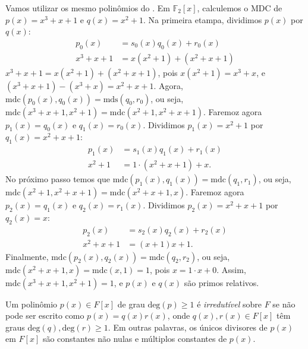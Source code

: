 \begin{example}
  Vamos utilizar os mesmo polinômios do .
  Em $\mathbb{F}_2[x]$, calculemos o MDC de $p(x) = x^3 + x + 1$ e $q(x) = x^2 + 1$. 
  Na primeira etampa, dividimos $p(x)$ por $q(x)$: 
  \begin{subequations}
    \begin{align}
    p_0(x) &= s_0(x) q_0(x) + r_0(x) \\
    x^3 + x + 1 &= x (x^2 + 1) + (x^2 + x + 1) 
    \end{align}
  \end{subequations}
  $x^3 + x + 1 = x (x^2 + 1) + (x^2 + x + 1)$, pois $x (x^2 + 1) = x^3 + x$, e $(x^3 + x + 1) - (x^3 + x) = x^2 + x + 1$. 
  Agora, $\text{mdc}(p_0(x),q_0(x)) = \text{mds}(q_0,r_0)$, ou seja, $\text{mdc}(x^3 + x + 1, x^2 + 1) = \text{mdc}(x^2 + 1, x^2 + x + 1)$.
  Faremoz agora $p_1(x) = q_0(x)$ e $q_1(x) = r_0(x)$.
  Dividimos $p_1(x) = x^2 + 1$ por $q_1(x) = x^2 + x + 1$: 
  \begin{subequations}
    \begin{align}
      p_1(x) &= s_1(x) q_1(x) + r_1(x) \\
      x^2 + 1 &= 1 \cdot (x^2 + x + 1) + x .
    \end{align}
  \end{subequations}
  No próximo passo temos que $\text{mdc}(p_1(x),q_1(x)) = \text{mdc}(q_1,r_1)$, ou seja, 
  $\text{mdc}(x^2 + 1, x^2 + x + 1) = \text{mdc}(x^2 + x + 1, x)$. 
  Faremoz agora $p_2(x) = q_1(x)$ e $q_2(x) = r_1(x)$.
  Dividimos $p_2(x) = x^2 + x + 1$ por $q_2(x) = x$: 
  \begin{subequations}
    \begin{align}
      p_2(x) &= s_2(x) q_2(x) + r_2(x) \\ 
      x^2 + x + 1 &= (x + 1) x + 1 .
    \end{align}
  \end{subequations}
  Finalmente, $\text{mdc}(p_2(x),q_2(x)) = \text{mdc}(q_2,r_2)$, ou seja,
  $\text{mdc}(x^2 + x + 1, x) = \text{mdc}(x, 1) = 1$, pois $x = 1 \cdot x + 0$. 
  Assim, $\text{mdc}(x^3 + x + 1, x^2 + 1) = 1$, e $p(x)$ e $q(x)$ são primos relativos.
\end{example}

\begin{definition}
  Um polinômio $p(x) \in F[x]$ de grau $\text{deg}(p) \geq 1$ é
  \emph{irredutível} sobre $F$ se não pode ser escrito como $p(x) = q(x) r(x)$,
  onde $q(x), r(x) \in F[x]$ têm graus $\text{deg}(q), \text{deg}(r) \geq 1$.
  Em outras palavras, os únicos divisores de $p(x)$ em $F[x]$ são constantes
  não nulas e múltiplos constantes de $p(x)$.
\end{definition}

